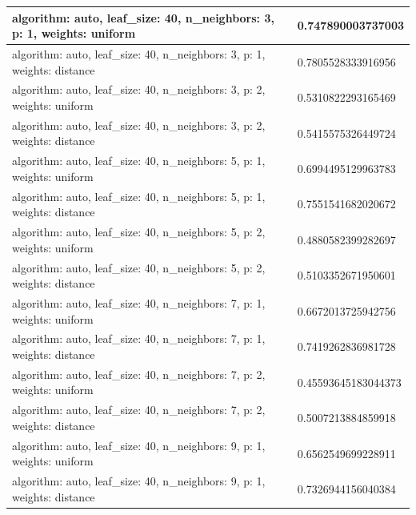 \documentclass{report}
\begin{document}
{\begin{longtable}{|p{295.6px}|p{100.3px}|}
                    \hline
                    algorithm: auto, leaf\_size: 40, n\_neighbors: 3, p: 1, weights: uniform & 0.747890003737003 \\
                    \hline
                    algorithm: auto, leaf\_size: 40, n\_neighbors: 3, p: 1, weights: distance & 0.7805528333916956 \\
                    \hline
                    algorithm: auto, leaf\_size: 40, n\_neighbors: 3, p: 2, weights: uniform & 0.5310822293165469 \\
                    \hline
                    algorithm: auto, leaf\_size: 40, n\_neighbors: 3, p: 2, weights: distance & 0.5415575326449724 \\
                    \hline
                    algorithm: auto, leaf\_size: 40, n\_neighbors: 5, p: 1, weights: uniform & 0.6994495129963783 \\
                    \hline
                    algorithm: auto, leaf\_size: 40, n\_neighbors: 5, p: 1, weights: distance & 0.7551541682020672 \\
                    \hline
                    algorithm: auto, leaf\_size: 40, n\_neighbors: 5, p: 2, weights: uniform & 0.4880582399282697 \\
                    \hline
                    algorithm: auto, leaf\_size: 40, n\_neighbors: 5, p: 2, weights: distance & 0.5103352671950601 \\
                    \hline
                    algorithm: auto, leaf\_size: 40, n\_neighbors: 7, p: 1, weights: uniform & 0.6672013725942756 \\
                    \hline
                    algorithm: auto, leaf\_size: 40, n\_neighbors: 7, p: 1, weights: distance & 0.7419262836981728 \\
                    \hline
                    algorithm: auto, leaf\_size: 40, n\_neighbors: 7, p: 2, weights: uniform & 0.45593645183044373 \\
                    \hline
                    algorithm: auto, leaf\_size: 40, n\_neighbors: 7, p: 2, weights: distance & 0.5007213884859918 \\
                    \hline
                    algorithm: auto, leaf\_size: 40, n\_neighbors: 9, p: 1, weights: uniform & 0.6562549699228911 \\
                    \hline
                    algorithm: auto, leaf\_size: 40, n\_neighbors: 9, p: 1, weights: distance & 0.7326944156040384 \\
                    \hline

\end{longtable}}
\end{document}
